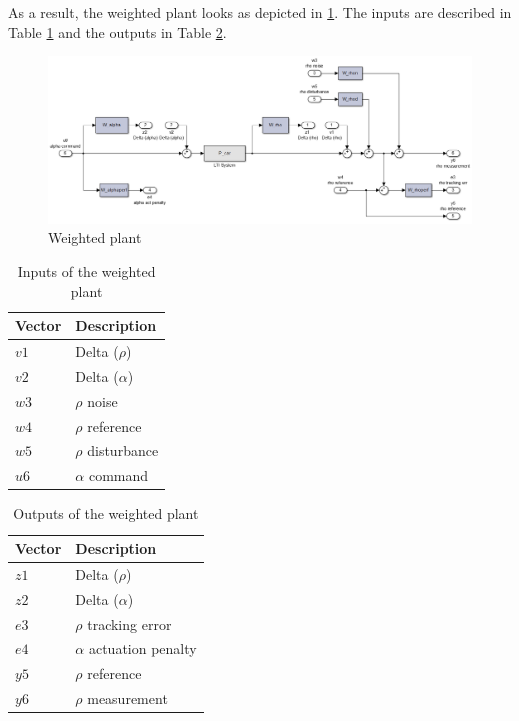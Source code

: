 \documentclass[conference]{IEEEtran}
\begin{document}
As a result, the weighted plant looks as depicted in \ref{figure:model_car}. The inputs are described in Table \ref{figure:model_car_inputs} and the outputs in Table \ref{figure:model_car_outputs}.

\begin{figure}[h]
\centering
  \includegraphics[width=.47\textwidth]{pics/model_car.png} 
  \caption{Weighted plant}  
  \label{figure:model_car}
\end{figure}


\begin{table}[h]
\begin{center}
\begin{tabular}{|l||l|}
\hline
Vector 		& Description 		\\
\hline
$v1$ 		& Delta ($\rho$) 	\\
\hline
$v2$		& Delta ($\alpha$) 	\\
\hline
\hline
$w3$		& $\rho$ noise 		\\
\hline
$w4$		& $\rho$ reference	\\
\hline
$w5$		& $\rho$ disturbance 		\\
\hline
\hline
$u6$		& $\alpha$ command	\\
\hline
\end{tabular}
\caption{Inputs of the weighted plant}  
\label{figure:model_car_inputs}
\end{center}
\end{table}

\begin{table}[h]
\begin{center}
\begin{tabular}{|l||l|}
\hline
Vector 		& Description 		\\
\hline
$z1$ 		& Delta ($\rho$) 	\\
\hline
$z2$		& Delta ($\alpha$) 	\\
\hline
\hline
$e3$		& $\rho$ tracking error 		\\
\hline
$e4$		& $\alpha$ actuation penalty	\\
\hline
\hline
$y5$		& $\rho$ reference 		\\
\hline
$y6$		& $\rho$ measurement	\\
\hline
\end{tabular}
\caption{Outputs of the weighted plant}  
\label{figure:model_car_outputs}
\end{center}
\end{table}
\end{document}
